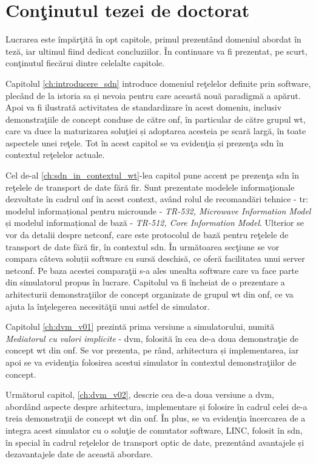 \section{Conţinutul tezei de doctorat}

Lucrarea este împărţită în opt capitole, primul prezentând domeniul abordat în teză, iar ultimul fiind dedicat concluziilor. În continuare va fi prezentat, pe scurt, conţinutul fiecărui dintre celelalte capitole.

Capitolul \ref{ch:introducere_sdn} introduce domeniul reţelelor definite prin software, plecând de la istoria sa și nevoia pentru care această nouă paradigmă a apărut. Apoi va fi ilustrată activitatea de standardizare în acest domeniu, inclusiv demonstraţiile de concept conduse de către \gls{onf}, în particular de către grupul \gls{wt}, care va duce la maturizarea soluţiei și adoptarea acesteia pe scară largă, în toate aspectele unei reţele. Tot în acest capitol se va evidenţia și prezenţa \gls{sdn} în contextul reţelelor actuale.

Cel de-al \ref{ch:sdn_in_contextul_wt}-lea capitol pune accent pe prezenţa \gls{sdn} în reţelele de transport de date fără fir. Sunt prezentate modelele informaţionale dezvoltate în cadrul \gls{onf} în acest context, având rolul de recomandări tehnice - \gls{tr}: modelul informațional pentru microunde - \textit{TR-532, Microwave Information Model} și modelul informațional de bază - \textit{TR-512, Core Information Model}. Ulterior se vor da detalii despre \gls{netconf}, care este protocolul de bază pentru reţelele de transport de date fără fir, în contextul \gls{sdn}. În următoarea secţiune se vor compara câteva soluții software cu sursă deschisă, ce oferă facilitatea unui server \gls{netconf}. Pe baza acestei comparaţii s-a ales unealta software care va face parte din simulatorul propus în lucrare. Capitolul va fi încheiat de o prezentare a arhitecturii demonstraţiilor de concept organizate de grupul \gls{wt} din \gls{onf}, ce va ajuta la înţelegerea necesităţii unui astfel de simulator.

Capitolul \ref{ch:dvm_v01} prezintă prima versiune a simulatorului, numită \textit{Mediatorul cu valori implicite} - \gls{dvm}, folosită în cea de-a doua demonstraţie de concept \gls{wt} din \gls{onf}. Se vor prezenta, pe rând, arhitectura și implementarea, iar apoi se va evidenţia folosirea acestui simulator în contextul demonstraţiilor de concept.

Următorul capitol, \ref{ch:dvm_v02}, descrie cea de-a doua versiune a \gls{dvm}, abordând aspecte despre arhitectura, implementare și folosire în cadrul celei de-a treia demonstraţii de concept \gls{wt} din \gls{onf}. În plus, se va evidenţia încercarea de a integra acest simulator cu o soluţie de comutator software, LINC, folosit în \gls{sdn}, în special în cadrul reţelelor de transport optic de date, prezentând avantajele și dezavantajele date de această abordare.

